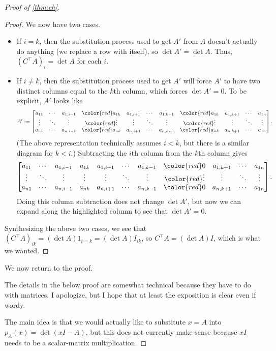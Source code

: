 \begin{proof}[Proof of \autoref{thm:ch}]
\begin{proof}
		We now have two cases.
		\begin{itemize}
			\item If $i=k$, then the substitution process used to get $A'$ from $A$ doesn't actually do anything (we replace a row with itself), so $\det A'=\det A$. Thus, $\left(C^\intercal A\right)_{i}=\det A$ for each $i$.
			\item If $i\ne k$, then the substitution process used to get $A'$ will force $A'$ to have two distinct columns equal to the $k$th column, which forces $\det A'=0$. To be explicit, $A'$ looks like
			\[A':=\left[\begin{array}{@{}*{11}{c}@{}}
				a_{11} & \cdots & a_{1,i-1} & \color{red}a_{1k} & a_{1,i+1} & \cdots & a_{1,k-1} & \color{red}a_{1k} & a_{1,k+1} & \cdots & a_{1n} \\
				\vdots & \ddots & \vdots & \color{red}\vdots & \vdots & \ddots & \vdots & \color{red}\vdots & \vdots & \ddots & \vdots \\
				a_{n1} & \cdots & a_{n,i-1} & \color{red}a_{nk} & a_{n,i+1} & \cdots & a_{n,k-1} & \color{red}a_{nk} & a_{n,k+1} & \cdots & a_{1n} \\
			\end{array}\right].\]
			(The above representation technically assumes $i<k$, but there is a similar diagram for $k<i$.) Subtracting the $i$th column from the $k$th column gives
			\[\left[\begin{array}{@{}*{11}{c}@{}}
				a_{11} & \cdots & a_{1,i-1} & a_{1k} & a_{1,i+1} & \cdots & a_{1,k-1} & \color{red}0 & a_{1,k+1} & \cdots & a_{1n} \\
				\vdots & \ddots & \vdots & \vdots & \vdots & \ddots & \vdots & \color{red}\vdots & \vdots & \ddots & \vdots \\
				a_{n1} & \cdots & a_{n,i-1} & a_{nk} & a_{n,i+1} & \cdots & a_{n,k-1} & \color{red}0 & a_{n,k+1} & \cdots & a_{1n} \\
			\end{array}\right].\]
			Doing this column subtraction does not change $\det A'$, but now we can expand along the highlighted column to see that $\det A'=0$.
		\end{itemize}
		Synthesizing the above two cases, we see that $(C^\intercal A)_{ik}=(\det A)1_{i=k}=(\det A)I_{ik}$, so $C^\intercal A=(\det A)I$, which is what we wanted.
	\end{proof}
	We now return to the proof.
	\begin{warn}
		The details in the below proof are somewhat technical because they have to do with matrices. I apologize, but I hope that at least the exposition is clear even if wordy.
	\end{warn}
	The main idea is that we would actually like to substitute $x=A$ into $p_A(x)=\det(xI-A)$, but this does not currently make sense because $xI$ needs to be a scalar-matrix multiplication.
	

\end{proof}
